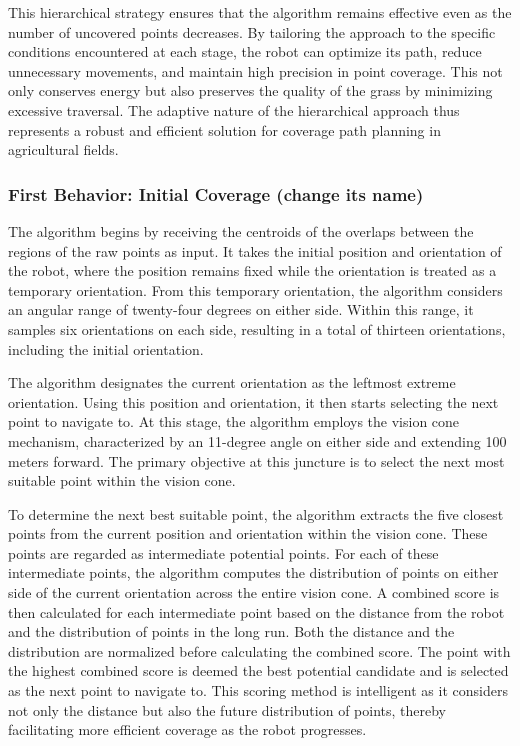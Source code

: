 \vspace*{6mm}   


This hierarchical strategy ensures that the algorithm remains effective even as the number of uncovered points decreases. By tailoring the approach to the specific conditions encountered at each stage, the robot can optimize its path, reduce unnecessary movements, and maintain high precision in point coverage. This not only conserves energy but also preserves the quality of the grass by minimizing excessive traversal. The adaptive nature of the hierarchical approach thus represents a robust and efficient solution for coverage path planning in agricultural fields.

\vspace*{6mm}  

\subsubsection{First Behavior: Initial Coverage (change its name)}

The algorithm begins by receiving the centroids of the overlaps between the regions of the raw points as input. It takes the initial position and orientation of the robot, where the position remains fixed while the orientation is treated as a temporary orientation. From this temporary orientation, the algorithm considers an angular range of twenty-four degrees on either side. Within this range, it samples six orientations on each side, resulting in a total of thirteen orientations, including the initial orientation.

\vspace*{6mm}  

The algorithm designates the current orientation as the leftmost extreme orientation. Using this position and orientation, it then starts selecting the next point to navigate to. At this stage, the algorithm employs the vision cone mechanism, characterized by an 11-degree angle on either side and extending 100 meters forward. The primary objective at this juncture is to select the next most suitable point within the vision cone.

\vspace*{6mm}  

To determine the next best suitable point, the algorithm extracts the five closest points from the current position and orientation within the vision cone. These points are regarded as intermediate potential points. For each of these intermediate points, the algorithm computes the distribution of points on either side of the current orientation across the entire vision cone. A combined score is then calculated for each intermediate point based on the distance from the robot and the distribution of points in the long run. Both the distance and the distribution are normalized before calculating the combined score. The point with the highest combined score is deemed the best potential candidate and is selected as the next point to navigate to. This scoring method is intelligent as it considers not only the distance but also the future distribution of points, thereby facilitating more efficient coverage as the robot progresses.


